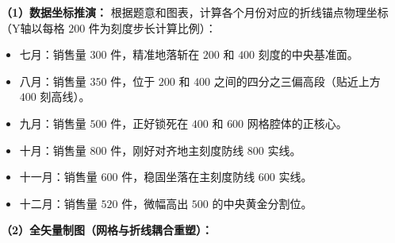 \textbf{（1）数据坐标推演：}
根据题意和图表，计算各个月份对应的折线锚点物理坐标（Y轴以每格 $200$ 件为刻度步长计算比例）：
\begin{itemize}
    \item 七月：销售量 $300$ 件，精准地落斩在 $200$ 和 $400$ 刻度的中央基准面。
    \item 八月：销售量 $350$ 件，位于 $200$ 和 $400$ 之间的四分之三偏高段（贴近上方 $400$ 刻高线）。
    \item 九月：销售量 $500$ 件，正好锁死在 $400$ 和 $600$ 网格腔体的正核心。
    \item 十月：销售量 $800$ 件，刚好对齐地主刻度防线 $800$ 实线。
    \item 十一月：销售量 $600$ 件，稳固坐落在主刻度防线 $600$ 实线。
    \item 十二月：销售量 $520$ 件，微幅高出 $500$ 的中央黄金分割位。
\end{itemize}

\textbf{（2）全矢量制图（网格与折线耦合重塑）：}

